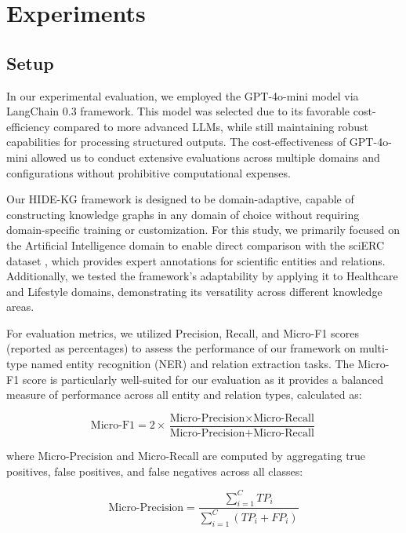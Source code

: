 \documentclass[11pt]{article}
\begin{document}
\section{Experiments}

\subsection{Setup}

In our experimental evaluation, we employed the GPT-4o-mini model via LangChain 0.3 framework. This model was selected due to its favorable cost-efficiency compared to more advanced LLMs, while still maintaining robust capabilities for processing structured outputs. The cost-effectiveness of GPT-4o-mini allowed us to conduct extensive evaluations across multiple domains and configurations without prohibitive computational expenses.

Our HIDE-KG framework is designed to be domain-adaptive, capable of constructing knowledge graphs in any domain of choice without requiring domain-specific training or customization. For this study, we primarily focused on the Artificial Intelligence domain to enable direct comparison with the sciERC dataset \cite{luan2018multi}, which provides expert annotations for scientific entities and relations. Additionally, we tested the framework's adaptability by applying it to Healthcare and Lifestyle domains, demonstrating its versatility across different knowledge areas.

For evaluation metrics, we utilized Precision, Recall, and Micro-F1 scores (reported as percentages) to assess the performance of our framework on multi-type named entity recognition (NER) and relation extraction tasks. The Micro-F1 score is particularly well-suited for our evaluation as it provides a balanced measure of performance across all entity and relation types, calculated as:

\begin{equation}
    \text{Micro-F1} = 2 \times \frac{\text{Micro-Precision} \times \text{Micro-Recall}}{\text{Micro-Precision} + \text{Micro-Recall}}
\end{equation}

where Micro-Precision and Micro-Recall are computed by aggregating true positives, false positives, and false negatives across all classes:

\begin{equation}
    \text{Micro-Precision} = \frac{\sum_{i=1}^{C} TP_i}{\sum_{i=1}^{C} (TP_i + FP_i)}
\end{equation}
\end{document}
